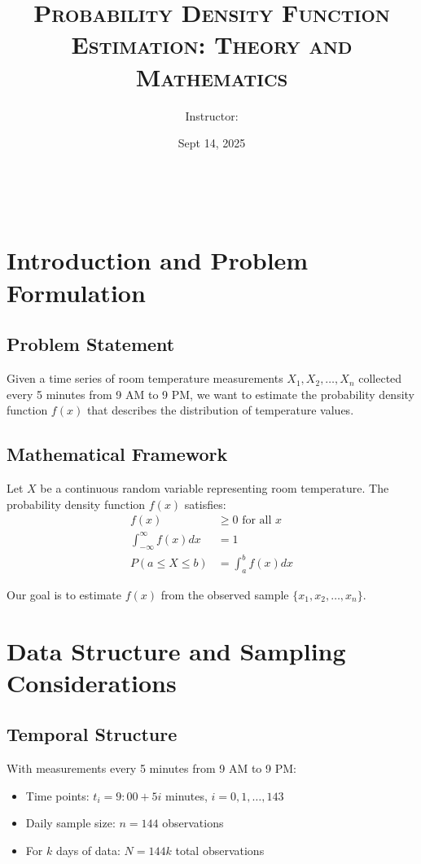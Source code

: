 \documentclass[12pt, xcolor=dvipsnames,svgnames,x11names]{article}
\makeatletter
\renewcommand{\maketitle}{%
      \begin{center}
         \begin{tcolorbox}[
               enhanced,
               colback=white,
               colframe=stormblue,
               boxrule=1pt,
               arc=3pt,
               left=0pt,
               right=0pt,
               top=0pt,
               bottom=0pt,
               drop shadow={goldenrod!25!white},
         ]
               \begin{tcolorbox}[
                  enhanced,
                  colback=goldenrod,
                  colframe=goldenrod,
                  boxrule=0pt,
                  arc=3pt,
                  sharp corners=south,
                  left=2em,
                  right=2em,
                  top=1em,
                  bottom=1em
               ]
                  \centering
                  {\LARGE\bfseries\textcolor{white}{\@title}}
               \end{tcolorbox}
               
               \vspace{1em}
               \centering
               {\large\textcolor{darkgray}{\@author}} \\[0.8em]
               {\normalsize\textcolor{darkgray}{\@date}}
               \vspace{1em}
         \end{tcolorbox}
      \end{center}
      \vspace{2em}
}
\newcommand{\hw}{Probability Density Function Estimation: Theory and Mathematics}
\newcommand{\duedate}{Sept 14, 2025}
\makeatother
\begin{document}
\title{\textsc{\hw\\
\coursenumber}}
\author{Instructor: \instructorname}
\date{\duedate}

\maketitle

\tableofcontents

\section{Introduction and Problem Formulation}

\subsection{Problem Statement}

Given a time series of room temperature measurements $X_1, X_2, \ldots, X_n$ collected every 5 minutes from 9 AM to 9 PM, we want to estimate the probability density function $f(x)$ that describes the distribution of temperature values.

\subsection{Mathematical Framework}

Let $X$ be a continuous random variable representing room temperature. The probability density function $f(x)$ satisfies:
\begin{align}
f(x) &\geq 0 \text{ for all } x \\
\int_{-\infty}^{\infty} f(x)dx &= 1 \\
P(a \leq X \leq b) &= \int_a^b f(x)dx
\end{align}

Our goal is to estimate $f(x)$ from the observed sample $\{x_1, x_2, \ldots, x_n\}$.

\section{Data Structure and Sampling Considerations}

\subsection{Temporal Structure}

With measurements every 5 minutes from 9 AM to 9 PM:
\begin{itemize}
\item Time points: $t_i = 9:00 + 5i$ minutes, $i = 0, 1, \ldots, 143$
\item Daily sample size: $n = 144$ observations
\item For $k$ days of data: $N = 144k$ total observations
\end{itemize}
\end{document}
